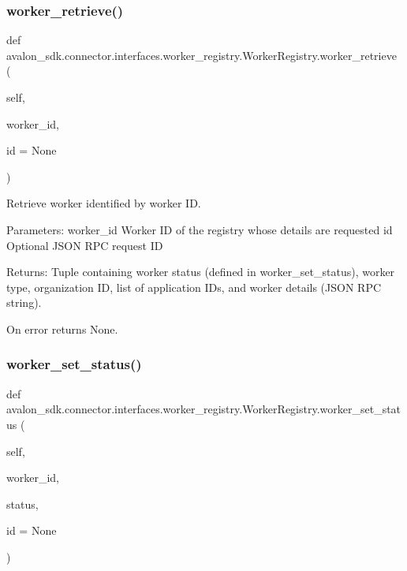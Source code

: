 \subsubsection{\texorpdfstring{worker\+\_\+retrieve()}{worker\_retrieve()}}
{\footnotesize\ttfamily def avalon\+\_\+sdk.\+connector.\+interfaces.\+worker\+\_\+registry.\+Worker\+Registry.\+worker\+\_\+retrieve (\begin{DoxyParamCaption}\item[{}]{self,  }\item[{}]{worker\+\_\+id,  }\item[{}]{id = {\ttfamily None} }\end{DoxyParamCaption})}

\begin{DoxyVerb}Retrieve worker identified by worker ID.

Parameters:
worker_id  Worker ID of the registry whose details are requested
id         Optional JSON RPC request ID

Returns:
Tuple containing worker status (defined in worker_set_status),
worker type, organization ID, list of application IDs, and worker
details (JSON RPC string).

On error returns None.
\end{DoxyVerb}
 \mbox{\label{classavalon__sdk_1_1connector_1_1interfaces_1_1worker__registry_1_1WorkerRegistry_aeb047c0d5a9f4bacc7ce51b81f883b27}} 
\subsubsection{\texorpdfstring{worker\+\_\+set\+\_\+status()}{worker\_set\_status()}}
{\footnotesize\ttfamily def avalon\+\_\+sdk.\+connector.\+interfaces.\+worker\+\_\+registry.\+Worker\+Registry.\+worker\+\_\+set\+\_\+status (\begin{DoxyParamCaption}\item[{}]{self,  }\item[{}]{worker\+\_\+id,  }\item[{}]{status,  }\item[{}]{id = {\ttfamily None} }\end{DoxyParamCaption})}


